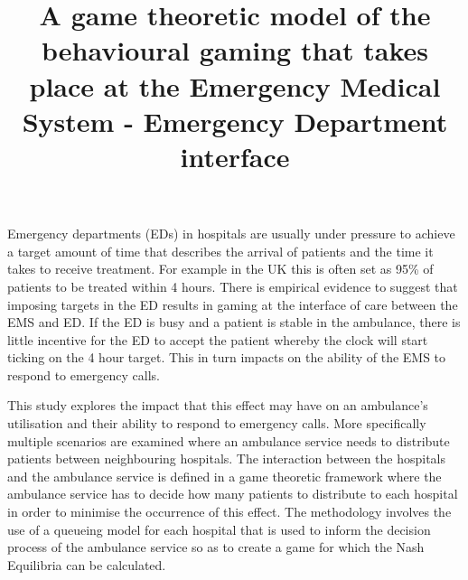 \documentclass{article}
\title{A game theoretic model of the behavioural gaming that takes place at the Emergency Medical System - Emergency Department interface}
\author{}
\date{}
\begin{document}
\maketitle

Emergency departments (EDs) in hospitals are usually under pressure to achieve a target amount of time that describes the arrival of patients and the time it takes to receive treatment. For example in the UK this is often set as 95\% of patients to be treated within 4 hours. There is empirical evidence to suggest that imposing targets in the ED results in gaming at the interface of care between the EMS and ED. If the ED is busy and a patient is stable in the ambulance, there is little incentive for the ED to accept the patient whereby the clock will start ticking on the 4 hour target. This in turn impacts on the ability of the EMS to respond to emergency calls.

This study explores the impact that this effect may have on an ambulance's utilisation and their ability to respond to emergency calls. More specifically multiple scenarios are examined where an ambulance service needs to distribute patients between neighbouring hospitals. The interaction between the hospitals and the ambulance service is defined in a game theoretic framework where the ambulance service has to decide how many patients to distribute to each hospital in order to minimise the occurrence of this effect. The methodology involves the use of a queueing model for each hospital that is used to inform the decision process of the ambulance service so as to create a game for which the Nash Equilibria can be calculated.
\end{document}
